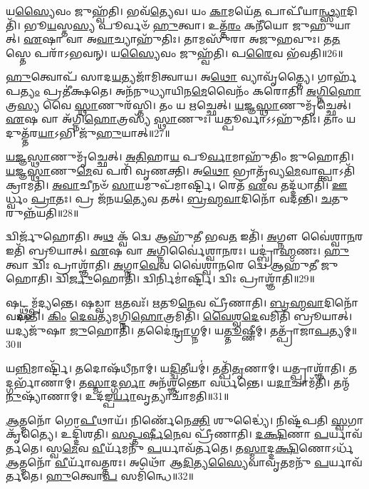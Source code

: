 𑌯\-\ul{𑌸𑍍𑌯𑍈}\-𑌵𑌂 𑌜𑍁𑌹𑍍𑌵᳴𑌤𑌿।
𑌭𑌵᳴\-\ul{𑌤𑍍𑌯𑍇}\-𑌵।
𑌯𑌂 \ul{𑌕𑌾}\-𑌮𑌯𑍇᳴\-\ul{𑌤} 𑌪𑌾𑌪𑍀᳴𑌯𑌾\-\ul{𑌨𑍍𑌥𑍍𑌸𑍍𑌯𑌾}\-𑌦𑌿𑌤𑌿᳴।
𑌭𑍂\-\ul{𑌯}\-𑌸𑍍𑌤\-\ul{𑌸𑍍𑌯} 𑌪𑍂𑌰𑍍𑌵𑍞᳴ \ul{𑌹𑍁}\-𑌤𑍍𑌵𑌾।
𑌉𑌤𑍍𑌤᳴\-\ul{𑌰𑌂} 𑌕𑌨𑍀᳴𑌯𑍋 𑌜𑍁𑌹𑍁𑌯𑌾𑌤𑍍।
\-\ul{𑌏}\-𑌷𑌾 𑌵𑌾 𑌅\-\ul{𑌵𑌾}\-𑌚𑍍𑌯𑌾𑌹𑍁᳴𑌤𑌿𑌃।
𑌤𑌾𑌮𑌸𑍁᳴𑌰𑌾 𑌅𑌜𑍁𑌹𑌵𑍁𑌃।
𑌤\-\ul{𑌤}\-𑌸𑍍𑌤𑍇 𑌪𑌰𑌾᳴\-𑌽𑌭𑌵𑌨𑍍।
𑌯\-\ul{𑌸𑍍𑌯𑍈}\-𑌵𑌂 𑌜𑍁𑌹𑍍𑌵᳴𑌤𑌿।
𑌪\-\ul{𑌰𑍈}\-𑌵 𑌭᳴𑌵𑌤𑌿॥26॥

\-\ul{𑌹𑍁}\-𑌤𑍍𑌵𑍋𑌪᳴ 𑌸𑌾𑌦\-\ul{𑌯}\-𑌤𑍍𑌯𑌜𑌾᳴𑌮𑌿𑌤𑍍𑌵𑌾𑌯।
𑌅\-\ul{𑌥𑍋} 𑌵𑍍𑌯𑌾𑌵𑍃᳴𑌤𑍍𑌤𑍍𑌯𑍈।
𑌗𑌾𑌰𑍍\mbox{}𑌹᳴𑌪\-\ul{𑌤𑍍𑌯𑌂} 𑌪𑍍𑌰𑌤𑍀॑𑌕𑍍𑌷𑌤𑍇।
𑌅𑌨᳴𑌨𑍁𑌧𑍍𑌯𑌾𑌯𑌿𑌨\-\ul{𑌮𑍇}\-𑌵𑍈𑌨𑌂᳴ 𑌕𑌰𑍋𑌤𑌿।
\-\ul{𑌅}\-\-\ul{𑌗𑍍𑌨𑌿}\-\-\ul{𑌹𑍋}\-𑌤𑍍𑌰\-\ul{𑌸𑍍𑌯} 𑌵𑍈 \ul{𑌸𑍍𑌥𑌾}\-𑌣𑍁𑌰᳴𑌸𑍍𑌤𑌿।
𑌤𑌂 𑌯 \ul{𑌋}\-𑌚𑍍𑌛𑍇𑌤𑍍।
\-\ul{𑌯}\-\-\ul{𑌜𑍍𑌞}\-\-\ul{𑌸𑍍𑌥𑌾}\-𑌣𑍁𑌮𑍃᳴𑌚𑍍𑌛𑍇𑌤𑍍।
\-\ul{𑌏}\-𑌷 𑌵𑌾 𑌅᳴𑌗𑍍𑌨𑌿\-\ul{𑌹𑍋}\-𑌤𑍍𑌰𑌸𑍍𑌯᳴ \ul{𑌸𑍍𑌥𑌾}\-𑌣𑍁𑌃।
𑌯𑌤𑍍𑌪𑍂𑌰𑍍𑌵𑌾\-𑌽𑌽𑌹𑍁᳴𑌤𑌿𑌃।
𑌤𑌾𑌂 𑌯𑌦𑍁𑌤𑍍𑌤᳴𑌰\-\ul{𑌯𑌾}\-𑌽𑌭𑌿 𑌜𑍁᳴\-\ul{𑌹𑍁}\-𑌯𑌾𑌤𑍍॥27॥

\-\ul{𑌯}\-\-\ul{𑌜𑍍𑌞}\-\-\ul{𑌸𑍍𑌥𑌾}\-𑌣𑍁𑌮𑍃᳴𑌚𑍍𑌛𑍇𑌤𑍍।
\-\ul{𑌅}\-\-\ul{𑌤𑌿}\-𑌹𑌾\-\ul{𑌯} 𑌪𑍂\-\ul{𑌰𑍍𑌵𑌾}\-𑌮𑌾𑌹𑍁᳴𑌤𑌿𑌂 𑌜𑍁𑌹𑍋𑌤𑌿।
\-\ul{𑌯}\-\-\ul{𑌜𑍍𑌞}\-\-\ul{𑌸𑍍𑌥𑌾}\-𑌣𑍁\-\ul{𑌮𑍇}\-𑌵 𑌪𑌰𑌿᳴ 𑌵𑍃𑌣𑌕𑍍𑌤𑌿।
𑌅\-\ul{𑌥𑍋} 𑌭𑍍𑌰𑌾𑌤𑍃᳴𑌵𑍍𑌯\-\ul{𑌮𑍇}\-𑌵𑌾𑌪𑍍𑌤𑍍𑌵𑌾𑌽𑌤𑌿᳴ 𑌕𑍍𑌰𑌾𑌮𑌤𑌿।
\-\ul{𑌅}\-\-\ul{𑌵𑌾}\-𑌚𑍀𑌨𑍞᳴ \ul{𑌸𑌾}\-𑌯𑌮𑍁𑌪᳴𑌮𑌾𑌰𑍍𑌷𑍍𑌟𑌿।
𑌰𑍇𑌤᳴ \ul{𑌏}\-𑌵 𑌤𑌦𑍍𑌦᳴𑌧𑌾𑌤𑌿।
\-\ul{𑌊}\-𑌰𑍍𑌧𑍍𑌵𑌂 \ul{𑌪𑍍𑌰𑌾}\-𑌤𑌃।
𑌪𑍍𑌰 𑌜᳴𑌨𑌯\-\ul{𑌤𑍍𑌯𑍇}\-𑌵 𑌤𑌤𑍍।
\-\ul{𑌬𑍍𑌰}\-\-\ul{𑌹𑍍𑌮}\-\-\ul{𑌵𑌾}\-𑌦𑌿𑌨𑍋᳴ 𑌵𑌦𑌨𑍍𑌤𑌿।
\-\ul{𑌚}\-𑌤𑍁𑌰𑍁𑌨𑍍𑌨᳴𑌯𑌤𑌿॥28॥

𑌦𑍍𑌵𑌿𑌰𑍍𑌜𑍁᳴𑌹𑍋𑌤𑌿।
𑌅\-\ul{𑌥} 𑌕𑍍𑌵᳴ 𑌦𑍍𑌵𑍇 𑌆𑌹𑍁᳴𑌤𑍀 𑌭𑌵\-\ul{𑌤} 𑌇𑌤𑌿᳴।
\-\ul{𑌅}\-𑌗𑍍𑌨𑍗 𑌵𑍈॑𑌶𑍍𑌵𑌾\-\ul{𑌨}\-𑌰 𑌇𑌤𑌿᳴ 𑌬𑍍𑌰𑍂𑌯𑌾𑌤𑍍।
\-\ul{𑌏}\-𑌷 𑌵𑌾 \ul{𑌅}\-𑌗𑍍𑌨𑌿𑌰𑍍𑌵𑍈॑𑌶𑍍𑌵𑌾\-\ul{𑌨}\-𑌰𑌃।
𑌯𑌦𑍍𑌬𑍍𑌰𑌾॑\-\ul{𑌹𑍍𑌮}\-𑌣𑌃।
\-\ul{𑌹𑍁}\-𑌤𑍍𑌵𑌾 𑌦𑍍𑌵𑌿𑌃 𑌪𑍍𑌰𑌾𑌶𑍍𑌞𑌾᳴𑌤𑌿।
\-\ul{𑌅}\-𑌗𑍍𑌨𑌾\-\ul{𑌵𑍇}\-𑌵 𑌵𑍈॑𑌶𑍍𑌵𑌾\-\ul{𑌨}\-𑌰𑍇 𑌦𑍍𑌵𑍇 𑌆𑌹𑍁᳴𑌤𑍀 𑌜𑍁𑌹𑍋𑌤𑌿।
𑌦𑍍𑌵𑌿\-\ul{𑌰𑍍𑌜𑍁}\-𑌹𑍋𑌤𑌿᳴।
𑌦𑍍𑌵𑌿𑌰𑍍𑌨𑌿𑌮𑌾॑𑌰𑍍𑌷𑍍𑌟𑌿।
𑌦𑍍𑌵𑌿𑌃 𑌪𑍍𑌰𑌾𑌶𑍍𑌞𑌾᳴𑌤𑌿॥29॥

𑌷𑌟𑍍𑌥𑍍𑌸𑌮𑍍𑌪᳴𑌦𑍍𑌯𑌨𑍍𑌤𑍇।
𑌷𑌡𑍍𑌵𑌾 \ul{𑌋}\-𑌤𑌵𑌃᳴।
\-\ul{𑌋}\-𑌤𑍂\-\ul{𑌨𑍇}\-𑌵 𑌪𑍍𑌰𑍀᳴𑌣𑌾𑌤𑌿।
\-\ul{𑌬𑍍𑌰}\-\-\ul{𑌹𑍍𑌮}\-\-\ul{𑌵𑌾}\-𑌦𑌿𑌨𑍋᳴ 𑌵𑌦𑌨𑍍𑌤𑌿।
\-\ul{𑌕𑌿𑌂} \ul{𑌦𑍇}\-\-\ul{𑌵}\-𑌤𑍍𑌯᳴𑌮𑌗𑍍𑌨𑌿\-\ul{𑌹𑍋}\-𑌤𑍍𑌰𑌮𑌿𑌤𑌿᳴।
\-\ul{𑌵𑍈}\-\-\ul{𑌶𑍍𑌵}\-\-\ul{𑌦𑍇}\-𑌵𑌮𑌿𑌤𑌿᳴ 𑌬𑍍𑌰𑍂𑌯𑌾𑌤𑍍।
𑌯𑌦𑍍𑌯𑌜𑍁᳴𑌷𑌾 \ul{𑌜𑍁}\-𑌹𑍋𑌤𑌿᳴।
𑌤𑌦𑍈॑\-\ul{𑌨𑍍𑌦𑍍𑌰𑌾}\-𑌗𑍍𑌨𑌮𑍍।
𑌯\-\ul{𑌤𑍍𑌤𑍂}\-𑌷𑍍𑌣𑍀𑌮𑍍।
𑌤𑌤𑍍𑌪𑍍𑌰𑌾᳴𑌜𑌾\-\ul{𑌪}\-𑌤𑍍𑌯𑌮𑍍॥30॥

𑌯\-\ul{𑌨𑍍𑌨𑌿}\-𑌮𑌾𑌰𑍍𑌷𑍍𑌟𑌿᳴।
𑌤𑌦𑍋𑌷᳴𑌧𑍀𑌨𑌾𑌮𑍍।
𑌯\-\ul{𑌦𑍍𑌦𑍍𑌵𑌿}\-𑌤𑍀𑌯𑌮𑍍॑।
𑌤𑌤𑍍𑌪𑌿᳴\-\ul{𑌤𑍃}\-𑌣𑌾𑌮𑍍।
𑌯𑌤𑍍𑌪𑍍𑌰𑌾𑌶𑍍𑌞𑌾᳴𑌤𑌿।
𑌤𑌦𑍍𑌗𑌰𑍍𑌭𑌾᳴𑌣𑌾𑌮𑍍।
𑌤\-\ul{𑌸𑍍𑌮𑌾}\-𑌦𑍍𑌗\-\ul{𑌰𑍍𑌭𑌾} 𑌅𑌨᳴𑌶𑍍𑌞𑌨𑍍𑌤𑍋 𑌵𑌰𑍍𑌧𑌨𑍍𑌤𑍇।
𑌯\-\ul{𑌦𑌾}\-𑌚𑌾𑌮᳴𑌤𑌿।
𑌤𑌨𑍍𑌮᳴\-\ul{𑌨𑍁}\-𑌷𑍍𑌯𑌾᳴𑌣𑌾𑌮𑍍।
𑌉𑌦᳴𑌙𑍍𑌪\-\ul{𑌰𑍍𑌯𑌾}\-𑌵𑍃𑌤𑍍𑌯𑌾𑌚𑌾᳴𑌮𑌤𑌿॥31॥

\-\ul{𑌆}\-𑌤𑍍𑌮𑌨𑍋᳴ 𑌗𑍋\-\ul{𑌪𑍀}\-𑌥𑌾𑌯᳴।
𑌨𑌿𑌰𑍍𑌣𑍇᳴𑌨𑍇\-\ul{𑌕𑍍𑌤𑌿} 𑌶𑍁𑌦𑍍𑌧𑍍𑌯𑍈॑।
𑌨𑌿𑌷𑍍𑌟᳴𑌪𑌤𑌿 \ul{𑌸𑍍𑌵}\-𑌗𑌾𑌕𑍃᳴𑌤𑍍𑌯𑍈।
𑌉𑌦𑍍𑌦𑌿᳴𑌶𑌤𑌿।
\-\ul{𑌸}\-\-\ul{𑌪𑍍𑌤}\-\-\ul{𑌰𑍍}\-𑌷𑍀\-\ul{𑌨𑍇}\-𑌵 𑌪𑍍𑌰𑍀᳴𑌣𑌾𑌤𑌿।
\-\ul{𑌦}\-\-\ul{𑌕𑍍𑌷𑌿}\-𑌣𑌾 \ul{𑌪}\-𑌰𑍍𑌯𑌾𑌵᳴𑌰𑍍𑌤𑌤𑍇।
𑌸𑍍𑌵\-\ul{𑌮𑍇}\-𑌵 \ul{𑌵𑍀}\-𑌰𑍍𑌯᳴𑌮𑌨𑍁᳴ \ul{𑌪}\-𑌰𑍍𑌯𑌾𑌵᳴𑌰𑍍𑌤𑌤𑍇।
𑌤\-\ul{𑌸𑍍𑌮𑌾}\-𑌦𑍍𑌦\-\ul{𑌕𑍍𑌷𑌿}\-𑌣𑍋\-𑌽𑌰𑍍𑌧᳴ \ul{𑌆}\-𑌤𑍍𑌮𑌨𑍋᳴ \ul{𑌵𑍀}\-𑌰𑍍𑌯𑌾᳴𑌵𑌤𑍍𑌤𑌰𑌃।
𑌅𑌥𑍋᳴ 𑌆\-\ul{𑌦𑌿}\-𑌤𑍍𑌯\-\ul{𑌸𑍍𑌯𑍈}\-𑌵𑌾𑌵𑍃\-\ul{𑌤}\-𑌮𑌨𑍁᳴ \ul{𑌪}\-𑌰𑍍𑌯𑌾𑌵᳴𑌰𑍍𑌤𑌤𑍇।
\-\ul{𑌹𑍁}\-𑌤𑍍𑌵𑍋\-\ul{𑌪} 𑌸𑌮𑌿᳴𑌨𑍍𑌧𑍇॥32॥

